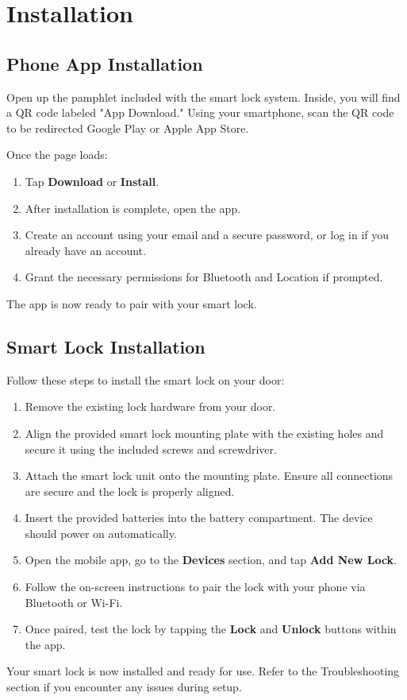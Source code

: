 \newpage
\section{Installation}

\subsection{Phone App Installation}
Open up the pamphlet included with the smart lock system. Inside, you will find a QR code labeled "App Download." Using your smartphone, scan the QR code to be redirected Google Play or Apple App Store.

Once the page loads:
\begin{enumerate}
    \item Tap \textbf{Download} or \textbf{Install}.
    \item After installation is complete, open the app.
    \item Create an account using your email and a secure password, or log in if you already have an account.
    \item Grant the necessary permissions for Bluetooth and Location if prompted.
\end{enumerate}

The app is now ready to pair with your smart lock.

\subsection{Smart Lock Installation}
Follow these steps to install the smart lock on your door:

\begin{enumerate}
    \item Remove the existing lock hardware from your door.
    \item Align the provided smart lock mounting plate with the existing holes and secure it using the included screws and screwdriver.
    \item Attach the smart lock unit onto the mounting plate. Ensure all connections are secure and the lock is properly aligned.
    \item Insert the provided batteries into the battery compartment. The device should power on automatically.
    \item Open the mobile app, go to the \textbf{Devices} section, and tap \textbf{Add New Lock}.
    \item Follow the on-screen instructions to pair the lock with your phone via Bluetooth or Wi-Fi.
    \item Once paired, test the lock by tapping the \textbf{Lock} and \textbf{Unlock} buttons within the app.
\end{enumerate}

Your smart lock is now installed and ready for use. Refer to the Troubleshooting section if you encounter any issues during setup.
